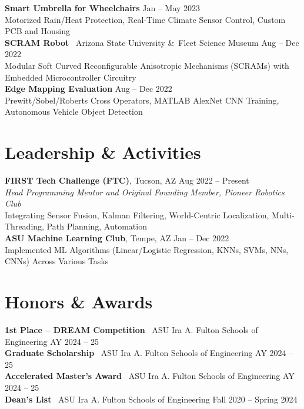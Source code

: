 \documentclass[10pt]{article}
\begin{document}
\textbf{Smart Umbrella for Wheelchairs} \hfill Jan -- May 2023 \\
\hspace*{2em}Motorized Rain/Heat Protection, Real-Time Climate Sensor Control, Custom PCB and Housing
\\
\textbf{SCRAM Robot} \textbar\ Arizona State University \&\ Fleet Science Museum \hfill Aug -- Dec 2022 \\
\hspace*{2em}Modular Soft Curved Reconfigurable Anisotropic Mechanisms (SCRAMs) with Embedded Microcontroller Circuitry
\\
\textbf{Edge Mapping Evaluation} \hfill Aug -- Dec 2022 \\
\hspace*{2em}Prewitt/Sobel/Roberts Cross Operators, MATLAB AlexNet CNN Training, Autonomous Vehicle Object Detection

\section*{Leadership \& Activities}
\textbf{FIRST Tech Challenge (FTC)}, Tucson, AZ \hfill Aug 2022 -- Present \\
\textit{Head Programming Mentor and Original Founding Member, Pioneer Robotics Club}\\
\hspace*{2em}Integrating Sensor Fusion, Kalman Filtering, World-Centric Localization, Multi-Threading, Path Planning, Automation
\\
\textbf{ASU Machine Learning Club}, Tempe, AZ \hfill Jan -- Dec 2022 \\
\hspace*{2em}Implemented ML Algorithms (Linear/Logistic Regression, KNNs, SVMs, NNs, CNNs) Across Various Tasks

\section*{Honors \& Awards}
\textbf{1st Place -- DREAM Competition} \textbar\ ASU Ira A. Fulton Schools of Engineering \hfill AY 2024 -- 25 \\
\textbf{Graduate Scholarship} \textbar\ ASU Ira A. Fulton Schools of Engineering \hfill AY 2024 -- 25 \\
\textbf{Accelerated Master's Award} \textbar\ ASU Ira A. Fulton Schools of Engineering \hfill AY 2024 -- 25\\
\textbf{Dean's List} \textbar\ ASU Ira A. Fulton Schools of Engineering \hfill Fall 2020 -- Spring 2024
\end{document}
